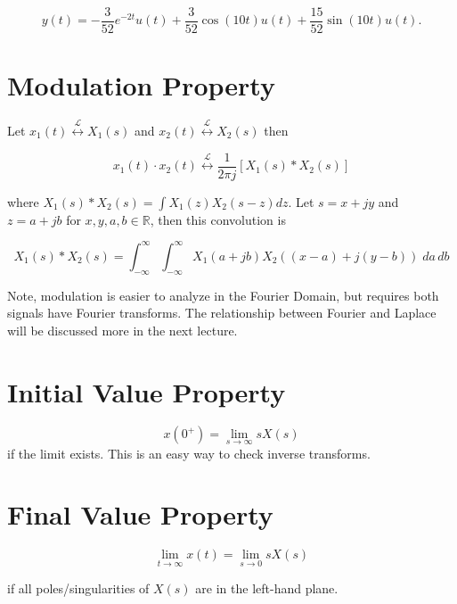 \documentclass{article}
\begin{document}
$$
y(t)=-\frac{3}{52} e^{-2 t} u(t)+\frac{3}{52} \cos (10 t) u(t)+\frac{15}{52} \sin (10 t) u(t) .
$$

\section{Modulation Property}

Let $x_{1}(t) \stackrel{\mathcal{L}}{\longleftrightarrow} X_{1}(s)$ and $x_{2}(t) \stackrel{\mathcal{L}}{\longleftrightarrow} X_{2}(s)$ then

$$
x_{1}(t) \cdot x_{2}(t) \stackrel{\mathcal{L}}{\longleftrightarrow} \frac{1}{2 \pi j}\left[X_{1}(s) * X_{2}(s)\right]
$$

where $X_{1}(s) * X_{2}(s)=\int X_{1}(z) X_{2}(s-z) d z$.  Let $s=x+j y$ and $z = a+jb$ for $x,y, a, b\in\mathbb{R}$, then this convolution is

$$
X_{1}(s) * X_{2}(s) = \int_{-\infty}^{\infty} \int_{-\infty}^{\infty} X_{1}(a+j b) X_{2}((x-a)+j(y-b)) \; da \, db
$$

Note, modulation is easier to analyze in the Fourier Domain, but requires both signals have Fourier transforms. The relationship between Fourier and Laplace will be discussed more in the next lecture.

\section{Initial Value Property}

$$
x\left(0^{+}\right)=\lim_{s \rightarrow \infty} s X(s)
$$
if the limit exists. This is an easy way to check inverse transforms.

\section{Final Value Property}


$$
\lim _{t \rightarrow \infty} x(t)=\lim_{s \rightarrow 0} s X(s)
$$

if all poles/singularities of $X(s)$ are in the left-hand plane.
\end{document}
